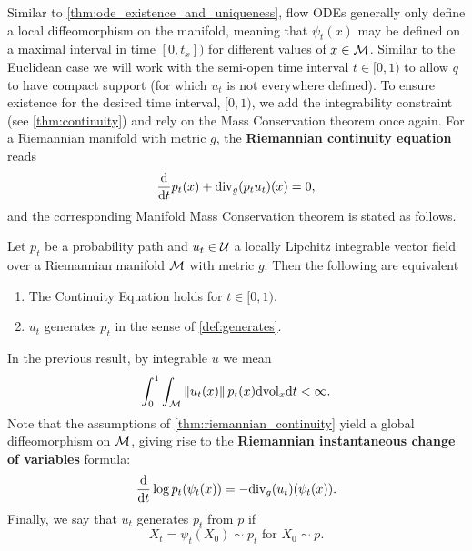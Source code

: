 \documentclass{fairmeta}
\newcommand{\highlight}[1]{{\color{metablue} \textbf{#1}}}
\renewcommand{\eqref}[1]{\labelcref{#1}}
\numberwithin{equation}{section}
\begin{document}
Similar to \cref{thm:ode_existence_and_uniqueness}, flow ODEs generally only define a local diffeomorphism on the manifold, meaning that $\psi_t(x)$ may be defined on a maximal interval in time $[0,t_x])$ for different values of $x\in{\mathcal{M}}$. Similar to the Euclidean case we will work with the semi-open time interval $t\in[0,1)$ to allow $q$ to have compact support (for which $u_t$ is not everywhere defined). To ensure existence for the desired time interval, $[0,1)$, we add the integrability constraint (see \cref{thm:continuity}) and rely on the Mass Conservation theorem once again.
For a Riemannian manifold with metric $g$, the \highlight{Riemannian continuity equation} reads
\begin{equation}\label{e:riemannian_continuity}
    \frac{\dd}{\dd t} p_t(x)+ \divv_g(p_t u_t)(x) = 0,%
\end{equation}
and the corresponding Manifold Mass Conservation theorem \citep{villani2009optimal} is stated as follows.
\begin{myframe}
\begin{theorem}\label{thm:riemannian_continuity}
    Let $p_t$ be a probability path and $u_t\in{\mathcal{U}}$ a locally Lipchitz integrable vector field over a Riemannian manifold ${\mathcal{M}}$ with metric $g$. Then the following are equivalent
    \begin{enumerate}
        \item The Continuity Equation \eqref{e:riemannian_continuity} holds for $t\in [0,1)$.
        \item $u_t$ generates $p_t$ in the sense of \ref{def:generates}.
    \end{enumerate}
      
\end{theorem}
\end{myframe}
In the previous result, by integrable $u$ we mean 
\begin{equation}\label{e:manifold_integrable}
 \int_0^1\int_\gM \norm{u_t(x)}p_t(x)\dd \vol_x \dd t < \infty. %
\end{equation}
Note that the assumptions of \cref{thm:riemannian_continuity} yield a global diffeomorphism on ${\mathcal{M}}$, giving rise to the \highlight{Riemannian instantaneous change of variables} formula:
\begin{equation}
    \label{e:r_instant_div} \frac{\dd}{\dd t} \log p_t(\psi_t (x)) = -\divv_g(u_t)(\psi_t(x)).%
\end{equation}
Finally, we say that $u_t$ generates $p_t$ from $p$ if 
\begin{equation}
    X_t=\psi_t(X_0)\sim p_t \text{ for } X_0\sim p.
\end{equation}
\end{document}
